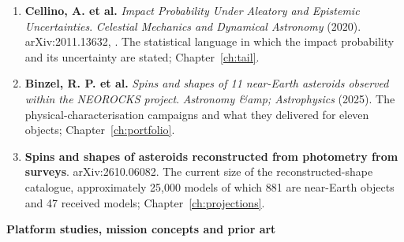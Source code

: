 \begin{enumerate}[leftmargin=2.9em,itemsep=4pt,resume]
\item \textbf{Cellino, A. et al.} \emph{Impact Probability Under Aleatory and
Epistemic Uncertainties}. \emph{Celestial Mechanics and Dynamical Astronomy}
(2020). arXiv:2011.13632,
. The statistical language in which
the impact probability and its uncertainty are stated;
Chapter~\ref{ch:tail}.

\item \textbf{Binzel, R. P. et al.} \emph{Spins and shapes of 11 near-Earth
asteroids observed within the NEOROCKS project}. \emph{Astronomy \&amp;
Astrophysics} (2025). The physical-characterisation campaigns and what they
delivered for eleven objects; Chapter~\ref{ch:portfolio}.

\item \textbf{Spins and shapes of asteroids reconstructed from photometry from
surveys}. arXiv:2610.06082. The current size of the reconstructed-shape
catalogue, approximately 25,000 models of which 881 are near-Earth objects
and 47 received models; Chapter~\ref{ch:projections}.

\end{enumerate}

\vspace{8pt}
{\sffamily\bfseries\small Platform studies, mission concepts and prior art}

